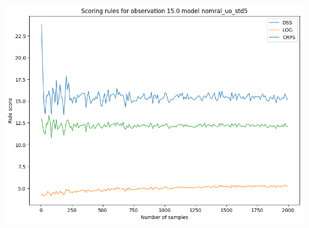 \documentclass[18pt]{beamer}
\begin{document}
\begin{frame}
\begin{columns}
\begin{column}{0.5\textwidth}
      \includegraphics[scale=0.23]{images/scroring_nomral_uo_std5_2}
    \end{column}
  \end{columns}
\end{frame}
\end{document}
